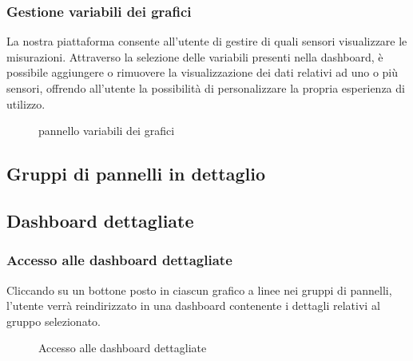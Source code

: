 \subsubsection{Gestione variabili dei grafici}
La nostra piattaforma consente all'utente di gestire di quali sensori visualizzare le misurazioni. Attraverso la selezione delle variabili presenti nella dashboard, è possibile aggiungere o rimuovere la visualizzazione dei dati relativi ad uno o più sensori, offrendo all'utente la possibilità di personalizzare la propria esperienza di utilizzo.
\begin{figure}[H]
    \centering
    \caption{pannello variabili dei grafici}
    \label{fig:my_label}
\end{figure}


\subsection{Gruppi di pannelli in dettaglio}




\subsection{Dashboard dettagliate}
\subsubsection{Accesso alle dashboard dettagliate}
Cliccando su un bottone posto in ciascun grafico a linee nei gruppi di pannelli, l'utente verrà reindirizzato in una dashboard contenente i dettagli relativi al gruppo selezionato.
\begin{figure}[H]
    \centering
    \caption{Accesso alle dashboard dettagliate}
    \label{fig:my_label}
\end{figure}

